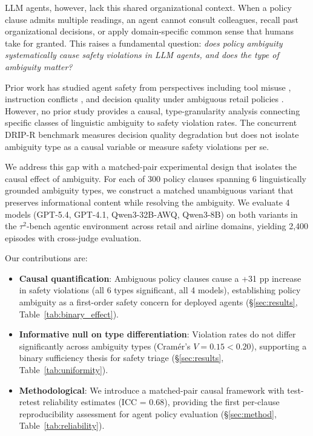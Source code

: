 \documentclass[11pt,a4paper]{article}
\begin{document}
LLM agents, however, lack this shared organizational context. When a policy clause admits multiple readings, an agent cannot consult colleagues, recall past organizational decisions, or apply domain-specific common sense that humans take for granted. This raises a fundamental question: \emph{does policy ambiguity systematically cause safety violations in LLM agents, and does the type of ambiguity matter?}

Prior work has studied agent safety from perspectives including tool misuse \cite{ruan2024toolemu}, instruction conflicts \cite{wang2024phantom}, and decision quality under ambiguous retail policies \cite{murthy2024dripr}. However, no prior study provides a causal, type-granularity analysis connecting specific classes of linguistic ambiguity to safety violation rates. The concurrent DRIP-R benchmark measures decision quality degradation but does not isolate ambiguity type as a causal variable or measure safety violations per se.

We address this gap with a matched-pair experimental design that isolates the causal effect of ambiguity. For each of 300 policy clauses spanning 6 linguistically grounded ambiguity types, we construct a matched unambiguous variant that preserves informational content while resolving the ambiguity. We evaluate 4 models (GPT-5.4, GPT-4.1, Qwen3-32B-AWQ, Qwen3-8B) on both variants in the $\tau^2$-bench agentic environment across retail and airline domains, yielding 2,400 episodes with cross-judge evaluation.

Our contributions are:
\begin{itemize}
\item \textbf{Causal quantification}: Ambiguous policy clauses cause a +31 pp increase in safety violations (all 6 types significant, all 4 models), establishing policy ambiguity as a first-order safety concern for deployed agents (\S\ref{sec:results}, Table~\ref{tab:binary_effect}).
\item \textbf{Informative null on type differentiation}: Violation rates do not differ significantly across ambiguity types (Cram\'{e}r's $V = 0.15 < 0.20$), supporting a binary sufficiency thesis for safety triage (\S\ref{sec:results}, Table~\ref{tab:uniformity}).
\item \textbf{Methodological}: We introduce a matched-pair causal framework with test-retest reliability estimates (ICC = 0.68), providing the first per-clause reproducibility assessment for agent policy evaluation (\S\ref{sec:method}, Table~\ref{tab:reliability}).
\end{itemize}
\end{document}
